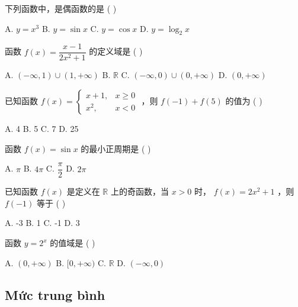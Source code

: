 \documentclass[11pt, a4paper]{article}
\begin{document}
\begin{baitap}[1]
下列函数中，是偶函数的是 ( )
\par\vspace{3pt}
\noindent A. $y = x^3$ \quad B. $y = \sin x$ \quad C. $y = \cos x$ \quad D. $y = \log_{2}x$
\end{baitap}
\begin{baitap}[2]
函数 $f(x) = \dfrac{x-1}{2x^2+1}$ 的定义域是 ( )
\par\vspace{3pt}
\noindent A. $(-\infty, 1) \cup (1, +\infty)$ \quad B. $\mathbb{R}$ \quad C. $(-\infty, 0) \cup (0, +\infty)$ \quad D. $(0, +\infty)$
\end{baitap}
\begin{baitap}[3]
已知函数 $f(x) = \begin{cases} x + 1, & x \ge 0 \\ x^2, & x < 0 \end{cases}$ ，则 $f(-1) + f(5)$ 的值为 ( )
\par\vspace{3pt}
\noindent A. 4 \quad B. 5 \quad C. 7 \quad D. 25
\end{baitap}
\begin{baitap}[4]
函数 $f(x) = \sin x$ 的最小正周期是 ( )
\par\vspace{3pt}
\noindent A. $\pi$ \quad B. $4\pi$ \quad C. $\dfrac{\pi}{2}$ \quad D. $2\pi$
\end{baitap}
\begin{baitap}[5]
已知函数 $f(x)$ 是定义在 $\mathbb{R}$ 上的奇函数，当 $x > 0$ 时， $f(x) = 2x^2 + 1$ ，则 $f(-1)$ 等于 ( )
\par\vspace{3pt}
\noindent A. -3 \quad B. 1 \quad C. -1 \quad D. 3
\end{baitap}
\begin{baitap}[6]
函数 $y = 2^x$ 的值域是 ( )
\par\vspace{3pt}
\noindent A. $(0, +\infty)$ \quad B. $[0, +\infty)$ \quad C. $\mathbb{R}$ \quad D. $(-\infty, 0)$
\end{baitap}
\subsection{Mức trung bình}
\end{document}
